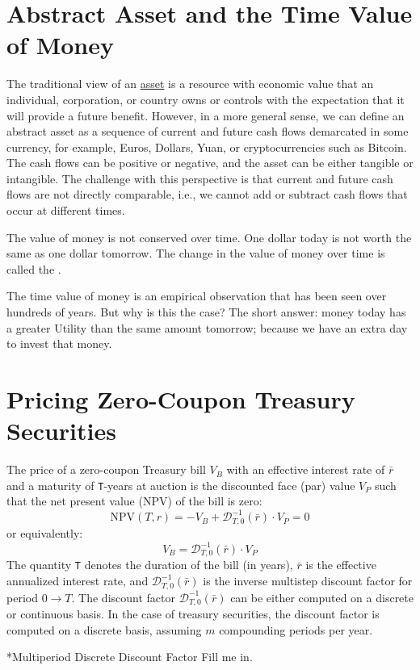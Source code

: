 \documentclass[11pt]{article}
\makeatletter
\theoremstyle{definition}
\renewcommand\subsection{\@startsection
	{subsection}{2}{0mm}
	{-0.05in}
	{0.5\baselineskip}
	{\normalfont\normalsize\bfseries}}
\makeatother
\begin{document}
\section*{Abstract Asset and the Time Value of Money}
The traditional view of an \href{https://en.wikipedia.org/wiki/Asset}{asset} is a resource with economic value that an individual, corporation, or country owns or controls with the expectation that it will provide a future benefit.
However, in a more general sense, we can define an abstract asset as a sequence of current and future cash flows demarcated in some currency, for example, Euros, Dollars, Yuan, or cryptocurrencies such as Bitcoin.
The cash flows can be positive or negative, and the asset can be either tangible or intangible.
The challenge with this perspective is that current and future cash flows are not directly comparable,
i.e., we cannot add or subtract cash flows that occur at different times.

\begin{concept}\label{concept:time-value-of-money}
	The value of money is not conserved over time. One dollar today is not worth the same as one dollar tomorrow. 
	The change in the value of money over time is called the .
	\end{concept}
	The time value of money is an empirical observation that has been seen over hundreds of years. 
	But why is this the case? The short answer: money today has a greater Utility than the same amount tomorrow; 
	because we have an extra day to invest that money. 


\section*{Pricing Zero-Coupon Treasury Securities}\label{sec:zero-coupon-treasury-securities}
The price of a zero-coupon Treasury bill $V_{B}$ with an effective interest rate of $\bar{r}$ and a maturity of \texttt{T}-years at auction 
is the discounted face (par) value $V_{P}$ such that the net present value (NPV) of the bill is zero:
\begin{equation}    
\text{NPV}(T,r) = -V_{B} + \mathcal{D}_{T,0}^{-1}(\bar{r})\cdot{V_{P}} = 0
\end{equation}
or equivalently:
\begin{equation}
    V_{B} = \mathcal{D}_{T,0}^{-1}(\bar{r})\cdot{V_{P}}
\end{equation}
The quantity \texttt{T} denotes the duration of the bill (in years), 
$\bar{r}$ is the effective annualized interest rate,  and $\mathcal{D}_{T,0}^{-1}(\bar{r})$ is the inverse multistep discount factor
for period $0\rightarrow{T}$. 
The discount factor $\mathcal{D}_{T,0}^{-1}(\bar{r})$ can be either computed on a discrete or continuous basis. 
In the case of treasury securities, the discount factor is computed on a discrete basis, assuming $m$ compounding periods per year.

\subsection*{Multiperiod Discrete Discount Factor}
Fill me in.
\end{document}
